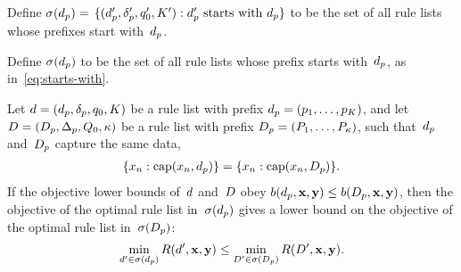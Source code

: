 \begin{theorem}
\label{thm:equivalent}
\begin{arxiv}
Define ${\sigma(d_p) = }$
${\{(d_p', \delta_p', q_0', K') : d_p' \textnormal{ starts with } d_p \}}$
to be the set of all rule lists whose prefixes start with~$d_p$.
\end{arxiv}
\begin{kdd}
Define $\sigma(d_p)$
to be the set of all rule lists whose prefix starts with~$d_p$,
as in~\eqref{eq:starts-with}.
\end{kdd}
%
Let ${{d} = (d_p, \delta_p, q_0, K)}$
be a rule list with prefix ${d_p = (p_1, \dots, p_K)}$,
and let ${{D} = (D_p, \Delta_p, Q_0, \kappa)}$
be a rule list with prefix ${D_p = (P_1, \dots, P_{\kappa})}$,
such that~$d_p$ and~$D_p$ capture the same data,~\ie
\begin{align}
\{x_n : \Cap(x_n, \Prefix)\} = \{x_n : \Cap(x_n, \PrefixB)\}.
\end{align}
%
If the objective lower bounds of~${d}$ and~${D}$
obey ${b(d_p, \mathbf{x}, \mathbf{y}) \le b(D_p, \mathbf{x}, \mathbf{y})}$,
then the objective of the optimal rule list in~$\sigma(d_p)$ gives a
lower bound on the objective of the optimal rule list in~$\sigma(D_p)$:
\begin{align}
\min_{\RL' \in \StartsWith(\Prefix)} \Obj(\RL', \x, \y)
\le \min_{\RLB' \in \StartsWith(\PrefixB)} \Obj(\RLB', \x, \y).
\label{eq:permutation}
\end{align}
\end{theorem}

